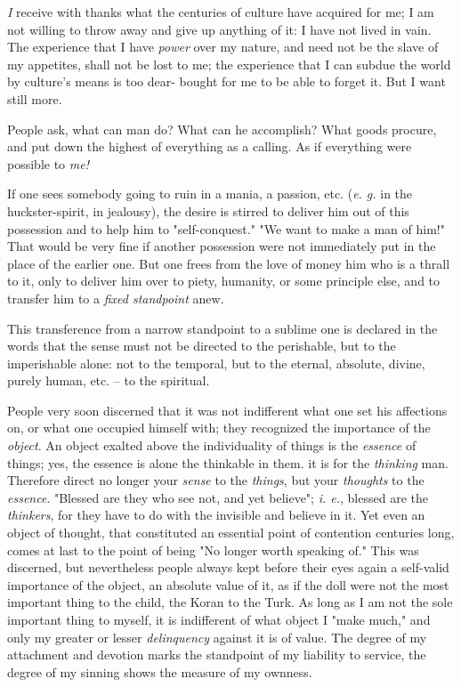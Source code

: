 \documentclass[a4paper]{book}
\begin{document}
\textit{I} receive with thanks what the centuries of culture have acquired for 
me; I am not willing to throw away and give up anything of it: I have not 
lived in vain. The experience that I have \textit{power} over my nature, and 
need not be the slave of my appetites, shall not be lost to me; the experience 
that I can subdue the world by culture's means is too dear- bought for me to 
be able to forget it. But I want still more.

People ask, what can man do? What can he accomplish? What goods procure, and 
put down the highest of everything as a calling. As if everything were 
possible to \textit{me!}

If one sees somebody going to ruin in a mania, a passion, etc. (\textit{e. g.} 
in the huckster-spirit, in jealousy), the desire is stirred to deliver him out 
of this possession and to help him to "{}self-conquest."{} "{}We want to make 
a man of him!"{} That would be very fine if another possession were not 
immediately put in the place of the earlier one. But one frees from the love 
of money him who is a thrall to it, only to deliver him over to piety, 
humanity, or some principle else, and to transfer him to a \textit{fixed 
standpoint} anew.

This transference from a narrow standpoint to a sublime one is declared in the 
words that the sense must not be directed to the perishable, but to the 
imperishable alone: not to the temporal, but to the eternal, absolute, divine, 
purely human, etc. -- to the spiritual.

People very soon discerned that it was not indifferent what one set his 
affections on, or what one occupied himself with; they recognized the 
importance of the \textit{object}. An object exalted above the individuality 
of things is the \textit{essence} of things; yes, the essence is alone the 
thinkable in them. it is for the \textit{thinking} man. Therefore direct no 
longer your \textit{sense} to the \textit{things}, but your \textit{thoughts} 
to the \textit{essence}. "{}Blessed are they who see not, and yet believe"{}; 
\textit{i. e.}, blessed are the \textit{thinkers}, for they have to do with 
the invisible and believe in it. Yet even an object of thought, that 
constituted an essential point of contention centuries long, comes at last to 
the point of being "{}No longer worth speaking of."{} This was discerned, but 
nevertheless people always kept before their eyes again a self-valid 
importance of the object, an absolute value of it, as if the doll were not the 
most important thing to the child, the Koran to the Turk. As long as I am not 
the sole important thing to myself, it is indifferent of what object I "{}make 
much,"{} and only my greater or lesser \textit{delinquency} against it is of 
value. The degree of my attachment and devotion marks the standpoint of my 
liability to service, the degree of my sinning shows the measure of my 
ownness.
\end{document}
